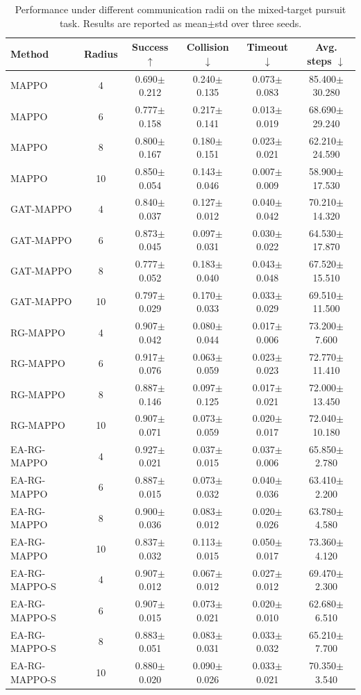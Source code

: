 \begin{table}[t]
\centering
\caption{Performance under different communication radii on the mixed-target pursuit task. Results are reported as mean$\pm$std over three seeds.}
\label{tab:comm_radius_results}
\begin{tabular}{lccccc}
\toprule
Method & Radius & Success $\uparrow$ & Collision $\downarrow$ & Timeout $\downarrow$ & Avg. steps $\downarrow$ \\
\midrule
MAPPO & 4 & 0.690$\pm$0.212 & 0.240$\pm$0.135 & 0.073$\pm$0.083 & 85.400$\pm$30.280 \\
MAPPO & 6 & 0.777$\pm$0.158 & 0.217$\pm$0.141 & 0.013$\pm$0.019 & 68.690$\pm$29.240 \\
MAPPO & 8 & 0.800$\pm$0.167 & 0.180$\pm$0.151 & 0.023$\pm$0.021 & 62.210$\pm$24.590 \\
MAPPO & 10 & 0.850$\pm$0.054 & 0.143$\pm$0.046 & 0.007$\pm$0.009 & 58.900$\pm$17.530 \\
\midrule
GAT-MAPPO & 4 & 0.840$\pm$0.037 & 0.127$\pm$0.012 & 0.040$\pm$0.042 & 70.210$\pm$14.320 \\
GAT-MAPPO & 6 & 0.873$\pm$0.045 & 0.097$\pm$0.031 & 0.030$\pm$0.022 & 64.530$\pm$17.870 \\
GAT-MAPPO & 8 & 0.777$\pm$0.052 & 0.183$\pm$0.040 & 0.043$\pm$0.048 & 67.520$\pm$15.510 \\
GAT-MAPPO & 10 & 0.797$\pm$0.029 & 0.170$\pm$0.033 & 0.033$\pm$0.029 & 69.510$\pm$11.500 \\
\midrule
RG-MAPPO & 4 & 0.907$\pm$0.042 & 0.080$\pm$0.044 & 0.017$\pm$0.006 & 73.200$\pm$7.600 \\
RG-MAPPO & 6 & 0.917$\pm$0.076 & 0.063$\pm$0.059 & 0.023$\pm$0.023 & 72.770$\pm$11.410 \\
RG-MAPPO & 8 & 0.887$\pm$0.146 & 0.097$\pm$0.125 & 0.017$\pm$0.021 & 72.000$\pm$13.450 \\
RG-MAPPO & 10 & 0.907$\pm$0.071 & 0.073$\pm$0.059 & 0.020$\pm$0.017 & 72.040$\pm$10.180 \\
\midrule
EA-RG-MAPPO & 4 & 0.927$\pm$0.021 & 0.037$\pm$0.015 & 0.037$\pm$0.006 & 65.850$\pm$2.780 \\
EA-RG-MAPPO & 6 & 0.887$\pm$0.015 & 0.073$\pm$0.032 & 0.040$\pm$0.036 & 63.410$\pm$2.200 \\
EA-RG-MAPPO & 8 & 0.900$\pm$0.036 & 0.083$\pm$0.012 & 0.020$\pm$0.026 & 63.780$\pm$4.580 \\
EA-RG-MAPPO & 10 & 0.837$\pm$0.032 & 0.113$\pm$0.015 & 0.050$\pm$0.017 & 73.360$\pm$4.120 \\
\midrule
EA-RG-MAPPO-S & 4 & 0.907$\pm$0.012 & 0.067$\pm$0.012 & 0.027$\pm$0.012 & 69.470$\pm$2.300 \\
EA-RG-MAPPO-S & 6 & 0.907$\pm$0.015 & 0.073$\pm$0.021 & 0.020$\pm$0.010 & 62.680$\pm$6.510 \\
EA-RG-MAPPO-S & 8 & 0.883$\pm$0.051 & 0.083$\pm$0.031 & 0.033$\pm$0.032 & 65.210$\pm$7.700 \\
EA-RG-MAPPO-S & 10 & 0.880$\pm$0.020 & 0.090$\pm$0.026 & 0.033$\pm$0.021 & 70.350$\pm$3.540 \\
\bottomrule
\end{tabular}
\end{table}
